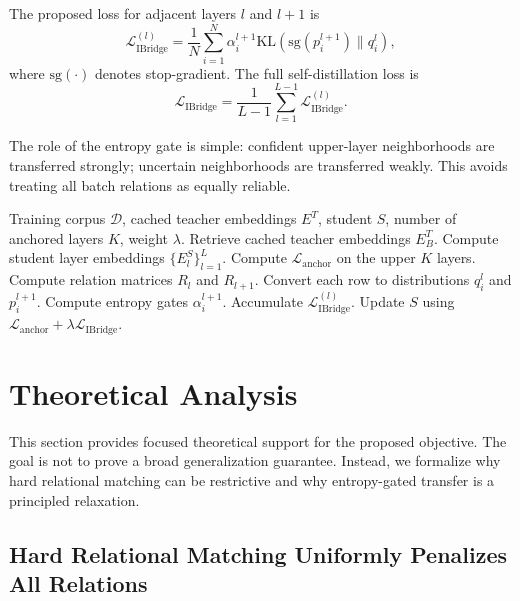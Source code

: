 \documentclass[letterpaper]{article}
\begin{document}
The proposed loss for adjacent layers $l$ and $l+1$ is
\begin{equation}
    \mathcal{L}_{\mathrm{IBridge}}^{(l)}
    =
    \frac{1}{N}
    \sum_{i=1}^{N}
    \alpha_i^{l+1}
    \mathrm{KL}\left(
    \mathrm{sg}(p_i^{l+1})\|q_i^l
    \right),
\end{equation}
where $\mathrm{sg}(\cdot)$ denotes stop-gradient. The full self-distillation loss is
\begin{equation}
    \mathcal{L}_{\mathrm{IBridge}}
    =
    \frac{1}{L-1}
    \sum_{l=1}^{L-1}
    \mathcal{L}_{\mathrm{IBridge}}^{(l)}.
\end{equation}

The role of the entropy gate is simple: confident upper-layer neighborhoods are transferred strongly; uncertain neighborhoods are transferred weakly. This avoids treating all batch relations as equally reliable.

\begin{algorithm}[t]
\caption{Training with InfoBridge}
\begin{algorithmic}[1]
\REQUIRE Training corpus $\mathcal{D}$, cached teacher embeddings $E^T$, student $S$, number of anchored layers $K$, weight $\lambda$.
    \STATE Retrieve cached teacher embeddings $E^T_B$.
    \STATE Compute student layer embeddings $\{E_l^S\}_{l=1}^L$.
    \STATE Compute $\mathcal{L}_{\mathrm{anchor}}$ on the upper $K$ layers.
        \STATE Compute relation matrices $R_l$ and $R_{l+1}$.
        \STATE Convert each row to distributions $q_i^l$ and $p_i^{l+1}$.
        \STATE Compute entropy gates $\alpha_i^{l+1}$.
        \STATE Accumulate $\mathcal{L}_{\mathrm{IBridge}}^{(l)}$.
    \ENDFOR
    \STATE Update $S$ using $\mathcal{L}_{\mathrm{anchor}}+\lambda\mathcal{L}_{\mathrm{IBridge}}$.
\ENDFOR
\end{algorithmic}
\end{algorithm}

\section{Theoretical Analysis}

This section provides focused theoretical support for the proposed objective. The goal is not to prove a broad generalization guarantee. Instead, we formalize why hard relational matching can be restrictive and why entropy-gated transfer is a principled relaxation.

\subsection{Hard Relational Matching Uniformly Penalizes All Relations}
\end{document}
